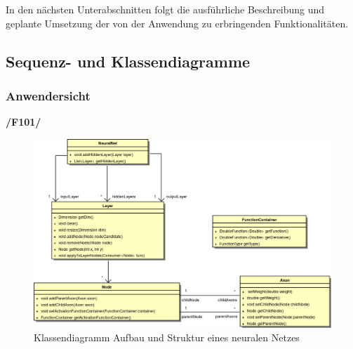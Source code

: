 In den nächsten Unterabschnitten folgt die ausführliche Beschreibung und geplante Umsetzung der von der Anwendung zu erbringenden Funktionalitäten.  

\subsection{Sequenz- und Klassendiagramme}
\subsubsection{Anwendersicht}

\textbf{/F101/}

\begin{figure}[h]
\begin{center}
\includegraphics[width=\textwidth]{Abbildungen/UML/uml_ronny/neuralNetKlassenDiagramm.png}
\caption{Klassendiagramm Aufbau und Struktur eines neuralen Netzes}
\label{fig_cdNet}
\end{center}
\end{figure}


